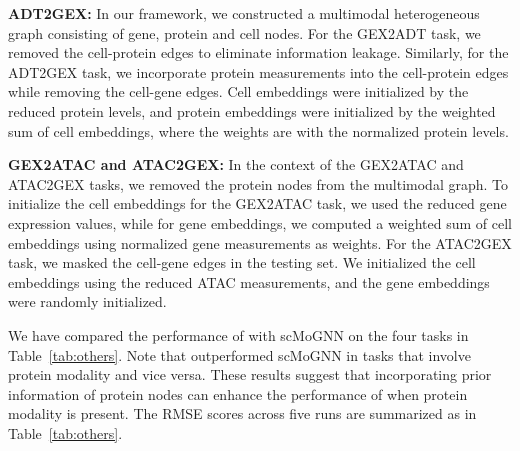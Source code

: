 \noindent \textbf{ADT2GEX:} In our framework, we constructed a multimodal heterogeneous graph consisting of gene, protein and cell nodes. For the GEX2ADT task, we removed the cell-protein edges to eliminate information leakage. Similarly, for the ADT2GEX task, we incorporate protein measurements into the cell-protein edges while removing the cell-gene edges. Cell embeddings were initialized by the reduced protein levels, and protein embeddings were initialized by the weighted sum of cell embeddings, where the weights are with the normalized protein levels. %

\noindent \textbf{GEX2ATAC and ATAC2GEX:} In the context of the GEX2ATAC and ATAC2GEX tasks, we removed the protein nodes from the multimodal graph. To initialize the cell embeddings for the GEX2ATAC task, we used the reduced gene expression values, while for gene embeddings, we computed a weighted sum of cell embeddings using normalized gene measurements as weights. For the ATAC2GEX task, we masked the cell-gene edges in the testing set. We initialized the cell embeddings using the reduced ATAC measurements, and the gene embeddings were randomly initialized.

We have compared the performance of \method{} with scMoGNN on the four tasks in Table~\ref{tab:others}. Note that \method{} outperformed scMoGNN in tasks that involve protein modality and vice versa. These results suggest that incorporating prior information of protein nodes can enhance the performance of \method{} when protein modality is present. The RMSE scores across five runs are summarized as in Table~\ref{tab:others}.

\begin{table}[h]
\centering
\vspace{-0.5em}
\caption{Results on other Single-Cell Mutimodal Tasks.}\label{tab:others}
\vspace{-1.2em}
\vspace{-1.8em}
\end{table}


